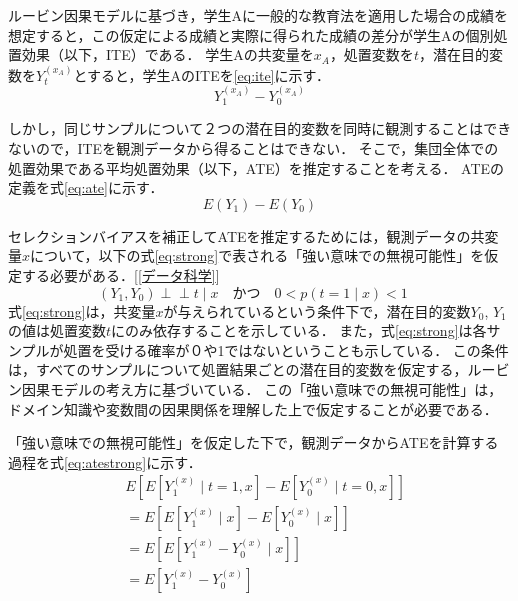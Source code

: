 \documentclass[dvipdfmx]{jreport}
\begin{document}
ルービン因果モデルに基づき，学生Aに一般的な教育法を適用した場合の成績を想定すると，この仮定による成績と実際に得られた成績の差分が学生Aの個別処置効果（以下，ITE）である．
学生Aの共変量を$x_{A}$，処置変数を$t$，潜在目的変数を$Y_t^{(x_A)}$とすると，学生AのITEを\eqref{eq:ite}に示す．
\begin{equation}
    Y_1^{(x_A)} - Y_0^{(x_A)} \label{eq:ite}
\end{equation}

しかし，同じサンプルについて２つの潜在目的変数を同時に観測することはできないので，ITEを観測データから得ることはできない．
そこで，集団全体での処置効果である平均処置効果（以下，ATE）を推定することを考える．
ATEの定義を式\eqref{eq:ate}に示す．
\begin{equation}
    E(Y_1) - E(Y_0) \label{eq:ate}
\end{equation}

セレクションバイアスを補正してATEを推定するためには，観測データの共変量$x$について，以下の式\eqref{eq:strong}で表される「強い意味での無視可能性」を仮定する必要がある．[\ref{データ科学}]
\begin{equation}
    (Y_1, Y_0) \perp\!\!\!\perp t \mid x \quad \label{eq:strong}
    \text{かつ} \quad 0 < p(t = 1 \mid x) < 1 \quad
\end{equation}
式\eqref{eq:strong}は，共変量$x$が与えられているという条件下で，潜在目的変数$Y_0$, $Y_1$の値は処置変数$t$にのみ依存することを示している．
また，式\eqref{eq:strong}は各サンプルが処置を受ける確率が０や1ではないということも示している．
この条件は，すべてのサンプルについて処置結果ごとの潜在目的変数を仮定する，ルービン因果モデルの考え方に基づいている．
この「強い意味での無視可能性」は，ドメイン知識や変数間の因果関係を理解した上で仮定することが必要である．

「強い意味での無視可能性」を仮定した下で，観測データからATEを計算する過程を式\eqref{eq:atestrong}に示す．
\begin{equation}
    \begin{aligned}
    &E[E[Y_1^{(x)} \mid t = 1, x] - E[Y_0^{(x)} \mid t = 0, x]] \\
    &= E[E[Y_1^{(x)} \mid x] - E[Y_0^{(x)} \mid x]] \\
    &= E[E[Y_1^{(x)} - Y_0^{(x)} \mid x]] \\
    &= E[Y_1^{(x)} - Y_0^{(x)}] \label{eq:atestrong}
    \end{aligned}
\end{equation}
\end{document}
